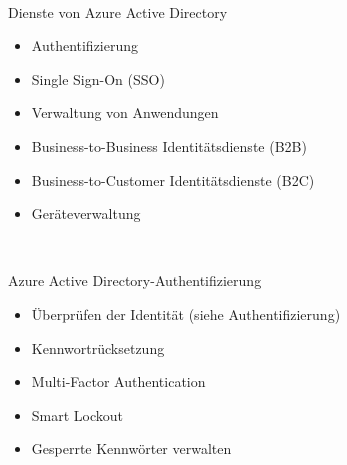 \documentclass{scrartcl}
\newenvironment{flashcard}[2][]{%
    #1
    \vfill
    \centerline{\Large{#2}}
    \vfill
    \newpage
}
{\newpage}
\begin{document}
    \begin{flashcard}[\ ]{Dienste von Azure Active Directory}
        \begin{itemize}
            \item Authentifizierung
            \item Single Sign-On (SSO)
            \item Verwaltung von Anwendungen
            \item Business-to-Business Identitätsdienste (B2B)
            \item Business-to-Customer Identitätsdienste (B2C)
            \item Geräteverwaltung
        \end{itemize}
    \end{flashcard}

    \begin{flashcard}[\ ]{Azure Active Directory-Authentifizierung}
        \begin{itemize}
            \item Überprüfen der Identität
                \newline(siehe Authentifizierung)
            \item Kennwortrücksetzung
            \item Multi-Factor Authentication
            \item Smart Lockout
            \item Gesperrte Kennwörter verwalten
        \end{itemize}
    \end{flashcard}
\end{document}
